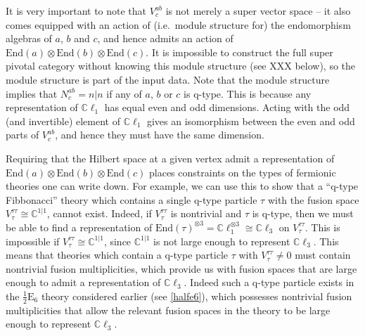 \documentclass[12pt,a4paper]{article}
\newcommand{\tp}{\otimes}
\newcommand{\cc}{\mathbb{C}}
\newcommand{\End}{\text{End}}
\newcommand{\cl}{\mathbb{C}\ell}
\newcommand{\ethan}[1]{{\color{amethyst}\footnotesize{(EL) #1}}}
\newcommand{\halfesix}{\frac{1}{2}\text{E}_6}
\begin{document}
It is very important to note that $V^{ab}_c$ is not merely a super vector space -- it also comes equipped with an action
of (i.e.\ module structure for) the endomorphism algebras of $a$, $b$ and $c$, and hence admits an action of $\End(a)\tp \End(b)\tp \End(c)$. 
It is impossible to construct the full super pivotal category without knowing this module structure (see XXX below), 
so the module
structure is part of the input data.
Note that the module structure implies that $N^{ab}_c = n|n$ if any of $a$, $b$ or $c$ is q-type.
This is because any representation of $\cl_1$ has equal even and odd dimensions.
Acting with the odd (and invertible) element of $\cl_1$ gives an isomorphism between the even and odd parts of $V^{ab}_c$, and hence they must have the same dimension.

Requiring that the Hilbert space at a given vertex admit a 
representation of $\End(a)\tp \End(b)\tp \End(c)$ places constraints on the types 
of fermionic theories one can write down. 
For example, we can use this to show that a ``q-type Fibbonacci'' theory 
which contains a single q-type particle $\tau$ with the fusion space $V^{\tau\tau}_{\tau}\cong \cc^{1|1}$, cannot exist. 
Indeed, if $V^{\tau\tau}_{\tau}$ is nontrivial and $\tau$ is q-type, 
then we must be able to find a representation of $\End(\tau)^{\tp 3} = \cl_1^{\tp 3} \cong \cl_3$ on $V^{\tau\tau}_{\tau}$.
This is impossible if $V^{\tau\tau}_{\tau}\cong \cc^{1|1}$, since $\cc^{1|1}$ is not large enough to represent $\cl_3$. 
This means that theories which contain a q-type particle $\tau$ with $V^{\tau\tau}_{\tau}\neq0$ must contain nontrivial 
fusion multiplicities, which provide us with fusion spaces that are large enough to admit a representation of $\cl_3$.
Indeed such a q-type particle exists in the $\halfesix$ theory considered earlier (see \ref{halfe6}), 
which possesses nontrivial fusion multiplicities that allow the relevant fusion spaces in the theory to be large enough to represent $\cl_3$. 

\end{document}
